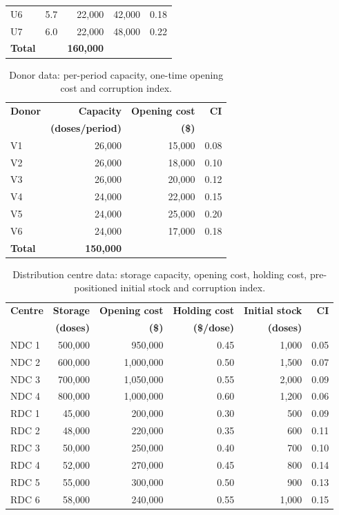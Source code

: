 \documentclass[a4paper]{elsarticle}
\begin{document}
{\begin{table}[h!]
\begin{tabular}{@{}lrrrr@{}}
U6 & 5.7 & 22{,}000 & 42{,}000 & 0.18 \\
U7 & 6.0 & 22{,}000 & 48{,}000 & 0.22 \\
\midrule
\textbf{Total} & & \textbf{160{,}000} & & \\
\bottomrule
\end{tabular}
\end{table}
\begin{table}[h!]
\centering
\caption{Donor data: per-period capacity, one-time opening cost and corruption index.}
\label{tab:donor}
\begin{tabular}{@{}lrrr@{}}
\toprule
\textbf{Donor} & \textbf{Capacity} & \textbf{Opening cost} & \textbf{CI} \\
 & \textbf{(doses/period)} & \textbf{(\$)} & \\
\midrule
V1 & 26{,}000 & 15{,}000 & 0.08 \\
V2 & 26{,}000 & 18{,}000 & 0.10 \\
V3 & 26{,}000 & 20{,}000 & 0.12 \\
V4 & 24{,}000 & 22{,}000 & 0.15 \\
V5 & 24{,}000 & 25{,}000 & 0.20 \\
V6 & 24{,}000 & 17{,}000 & 0.18 \\
\midrule
\textbf{Total} & \textbf{150{,}000} & & \\
\bottomrule
\end{tabular}
\end{table}
\begin{table}[h!]
\centering
\caption{Distribution centre data: storage capacity, opening cost, holding cost, pre-positioned initial stock and corruption index.}
\label{tab:dc}
\begin{tabular}{@{}lrrrrr@{}}
\toprule
\textbf{Centre} & \textbf{Storage} & \textbf{Opening cost} & \textbf{Holding cost} & \textbf{Initial stock} & \textbf{CI} \\
 & \textbf{(doses)} & \textbf{(\$)} & \textbf{(\$/dose)} & \textbf{(doses)} & \\
\midrule
NDC 1 & 500{,}000 & 950{,}000    & 0.45 & 1{,}000 & 0.05 \\
NDC 2 & 600{,}000 & 1{,}000{,}000 & 0.50 & 1{,}500 & 0.07 \\
NDC 3 & 700{,}000 & 1{,}050{,}000 & 0.55 & 2{,}000 & 0.09 \\
NDC 4 & 800{,}000 & 1{,}000{,}000 & 0.60 & 1{,}200 & 0.06 \\
\midrule
RDC 1 & 45{,}000 & 200{,}000 & 0.30 & 500     & 0.09 \\
RDC 2 & 48{,}000 & 220{,}000 & 0.35 & 600     & 0.11 \\
RDC 3 & 50{,}000 & 250{,}000 & 0.40 & 700     & 0.10 \\
RDC 4 & 52{,}000 & 270{,}000 & 0.45 & 800     & 0.14 \\
RDC 5 & 55{,}000 & 300{,}000 & 0.50 & 900     & 0.13 \\
RDC 6 & 58{,}000 & 240{,}000 & 0.55 & 1{,}000 & 0.15 \\
\bottomrule
\end{tabular}
\end{table}
}
\end{document}
